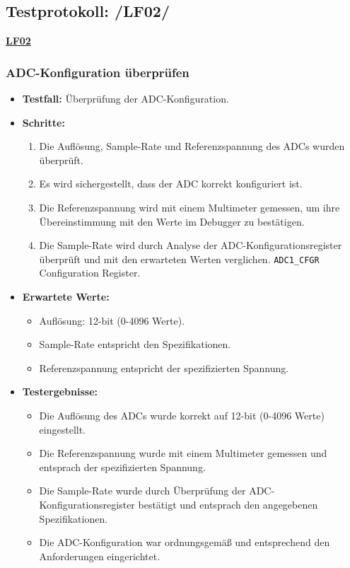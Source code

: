 \subsection{Testprotokoll: /LF02/}
\textbf{\hyperlink{LF02_Link}{LF02}} \\

\subsubsection{ADC-Konfiguration überprüfen}
\begin{itemize}
	\item \textbf{Testfall:} Überprüfung der ADC-Konfiguration.
	\item \textbf{Schritte:}
	\begin{enumerate}
		\item Die Auflösung, Sample-Rate und Referenzspannung des ADCs wurden überprüft.
		\item Es wird sichergestellt, dass der ADC korrekt konfiguriert ist.
		\item Die Referenzspannung wird mit einem Multimeter gemessen, um ihre Übereinstimmung mit den Werte im Debugger zu bestätigen.
		\item Die Sample-Rate wird durch Analyse der ADC-Konfigurationsregister überprüft und mit den erwarteten Werten verglichen. \texttt{ADC1\_CFGR} Configuration Register.
	\end{enumerate}
	\item \textbf{Erwartete Werte:}
	\begin{itemize}
		\item Auflösung: 12-bit (0-4096 Werte).
		\item Sample-Rate entspricht den Spezifikationen.
		\item Referenzspannung entspricht der spezifizierten Spannung.
	\end{itemize}
	\item \textbf{Testergebnisse:}
	\begin{itemize}
		\item Die Auflösung des ADCs wurde korrekt auf 12-bit (0-4096 Werte) eingestellt.
		\item Die Referenzspannung wurde mit einem Multimeter gemessen und entsprach der spezifizierten Spannung.
		\item Die Sample-Rate wurde durch Überprüfung der ADC-Konfigurationsregister bestätigt und entsprach den angegebenen Spezifikationen.
		\item Die ADC-Konfiguration war ordnungsgemäß und entsprechend den Anforderungen eingerichtet.
	\end{itemize}
\end{itemize}

